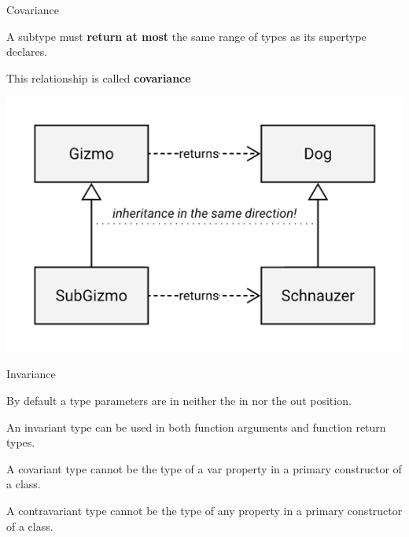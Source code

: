 \documentclass[xcolor=pdftex,dvipsnames,table]{beamer}
\newenvironment{bgverbatim}[1]{
  \vspace{5pt}#1\VerbatimEnvironment
  \begin{tcolorbox}[breakable,spartan]%
  \begin{Verbatim}[commandchars=&\[\]]}
  {\end{Verbatim}\end{tcolorbox}}
\newenvironment{wideitemize}{\itemize\addtolength{\itemsep}{5pt}}{\enditemize}
\begin{document}
\begin{frame}{Covariance}
  \begin{wideitemize}
    \item A subtype must \textbf{return at most} the same range of types as its supertype declares.
    \item This relationship is called \textbf{covariance}
  \end{wideitemize}
  \begin{center}
    \includegraphics[height=0.5\textheight,keepaspectratio]{images/covariant-return-types}
  \end{center}
\end{frame}


\begin{frame}{Invariance}
  \begin{wideitemize}
    \item By default a type parameters are in neither the in nor the out position.
    \item An invariant type can be used in both function arguments and function return types.
    \item A covariant type cannot be the type of a var property in a primary constructor of a class.
    \item A contravariant type cannot be the type of any property in a primary constructor of a class.
  \end{wideitemize}
\end{frame}
\end{document}
